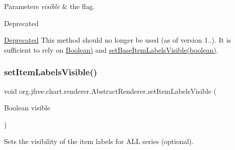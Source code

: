 \begin{DoxyParams}{Parameters}
{\em visible} & the flag.\\
\hline
\end{DoxyParams}
\begin{DoxyRefDesc}{Deprecated}
\item[\mbox{\hyperlink{deprecated__deprecated000128}{Deprecated}}]This method should no longer be used (as of version 1..). It is sufficient to rely on \mbox{\hyperlink{}{Boolean)}} and \mbox{\hyperlink{classorg_1_1jfree_1_1chart_1_1renderer_1_1_abstract_renderer_aef1e2688293f0bdb55b4c4cdaf0fde9c}{set\+Base\+Item\+Labels\+Visible(boolean)}}. \end{DoxyRefDesc}
\mbox{\label{classorg_1_1jfree_1_1chart_1_1renderer_1_1_abstract_renderer_a7c4b0f5905455a8e7271bf87a6ccbb7f}} 
\subsubsection{\texorpdfstring{set\+Item\+Labels\+Visible()}{setItemLabelsVisible()}\hspace{0.1cm}{\footnotesize\ttfamily [2/3]}}
{\footnotesize\ttfamily void org.\+jfree.\+chart.\+renderer.\+Abstract\+Renderer.\+set\+Item\+Labels\+Visible (\begin{DoxyParamCaption}\item[{Boolean}]{visible }\end{DoxyParamCaption})}

Sets the visibility of the item labels for A\+LL series (optional).



